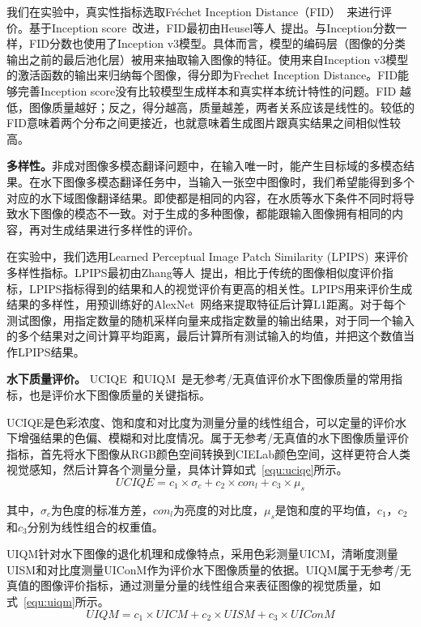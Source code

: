 我们在实验中，真实性指标选取Fréchet Inception Distance（FID）~\cite{heusel2017gans}来进行评价。基于Inception score~\cite{salimans2016improved}改进，FID最初由Heusel等人~\cite{heusel2017gans}提出。与Inception分数一样，FID分数也使用了Inception v3模型。具体而言，模型的编码层（图像的分类输出之前的最后池化层）被用来抽取输入图像的特征。使用来自Inception v3模型的激活函数的输出来归纳每个图像，得分即为Frechet Inception Distance。FID能够完善Inception score没有比较模型生成样本和真实样本统计特性的问题。FID 越低，图像质量越好；反之，得分越高，质量越差，两者关系应该是线性的。较低的FID意味着两个分布之间更接近，也就意味着生成图片跟真实结果之间相似性较高。

\textbf{多样性。}非成对图像多模态翻译问题中，在输入唯一时，能产生目标域的多模态结果。在水下图像多模态翻译任务中，当输入一张空中图像时，我们希望能得到多个对应的水下域图像翻译结果。即使都是相同的内容，在水质等水下条件不同时将导致水下图像的模态不一致。对于生成的多种图像，都能跟输入图像拥有相同的内容，再对生成结果进行多样性的评价。

在实验中，我们选用Learned Perceptual Image Patch Similarity (LPIPS)~\cite{zhang2018perceptual}来评价多样性指标。LPIPS最初由Zhang等人~\cite{zhang2018perceptual}提出，相比于传统的图像相似度评价指标，LPIPS指标得到的结果和人的视觉评价有更高的相关性。LPIPS用来评价生成结果的多样性，用预训练好的AlexNet~\cite{krizhevsky2017imagenet}网络来提取特征后计算L1距离。对于每个测试图像，用指定数量的随机采样向量来成指定数量的输出结果，对于同一个输入的多个结果对之间计算平均距离，最后计算所有测试输入的均值，并把这个数值当作LPIPS结果。

\textbf{水下质量评价。}
UCIQE~\cite{yang2015underwater}和UIQM~\cite{panetta2015human}是无参考/无真值评价水下图像质量的常用指标，也是评价水下图像质量的关键指标。

UCIQE是色彩浓度、饱和度和对比度为测量分量的线性组合，可以定量的评价水下增强结果的色偏、模糊和对比度情况。属于无参考/无真值的水下图像质量评价指标，首先将水下图像从RGB颜色空间转换到CIELab颜色空间，这样更符合人类视觉感知，然后计算各个测量分量，具体计算如式~\ref{equ:uciqe}所示。
\begin{equation}
\label{equ:uciqe}
UCIQE = c_1 \times \sigma_c + c_2 \times con_l + c_3 \times \mu_s
\end{equation}

其中，$ \sigma_c$为色度的标准方差，$con_l$为亮度的对比度，$\mu_s$是饱和度的平均值，$c_1$，$c_2$和$c_3$分别为线性组合的权重值。

UIQM针对水下图像的退化机理和成像特点，采用色彩测量UICM，清晰度测量UISM和对比度测量UIConM作为评价水下图像质量的依据。UIQM属于无参考/无真值的图像评价指标，通过测量分量的线性组合来表征图像的视觉质量，如式~\ref{equ:uiqm}所示。
\begin{equation}
\label{equ:uiqm}
UIQM = c_1 \times UICM + c_2 \times UISM + c_3 \times UIConM
\end{equation}

